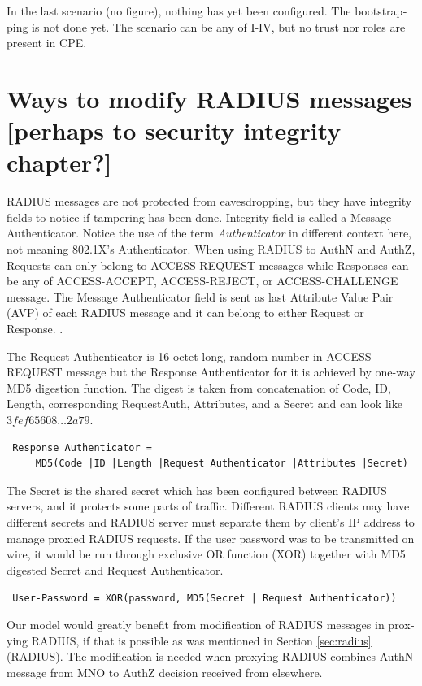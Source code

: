 \documentclass[12pt,a4paper,english]{tutthesis}
\begin{document}
\begin{otherlanguage}{english}
In the last scenario (no figure), nothing has yet been configured. The bootstrapping
is not done yet. The scenario can be any of I-IV, but no trust nor roles are present in CPE.
\section{Ways to modify RADIUS messages [perhaps to security integrity chapter?]}
\label{sec-4-7}
\label{sec:radius-macs}
RADIUS messages are not protected from eavesdropping, but they have
integrity fields to notice if tampering has been done.  
Integrity field is called a Message Authenticator.
Notice the use of the term \emph{Authenticator} in different context here, not
meaning 802.1X's Authenticator.
When using RADIUS to AuthN and AuthZ, Requests can only belong to ACCESS-REQUEST messages while
Responses can be any of ACCESS-ACCEPT, ACCESS-REJECT, or ACCESS-CHALLENGE message.
The Message Authenticator field is sent as last Attribute Value Pair (AVP)
of each RADIUS message and it can belong 
to either Request or Response. \cite[p.20]{radiusbook}.

The Request Authenticator is 16 octet long, random number in
ACCESS-REQUEST message but the Response Authenticator for it is achieved
by one-way MD5 digestion function. 
The digest is taken from concatenation of Code, ID, Length, corresponding
Request\-Auth, Attributes, and a Secret and can look like 
$3fef65608\ldots 2a79$. 
\begin{verbatim}
 Response Authenticator = 
     MD5(Code |ID |Length |Request Authenticator |Attributes |Secret)
\end{verbatim}
The Secret is the shared secret which has been configured between RADIUS servers,
and it protects some parts of traffic. 
Different RADIUS clients may have different
secrets and RADIUS server must separate them by client's IP address to
manage proxied RADIUS requests\cite{radiusbook}.
If the user password was to be transmitted on wire, it would be run
through exclusive OR function (XOR) together with MD5 digested Secret
and Request
Authenticator.
\begin{center}
{\tt 
User-Password = XOR(password, MD5(Secret | Request Authenticator))}
\end{center}



Our model would greatly benefit from modification of RADIUS messages in proxying
RADIUS, if that is possible as was mentioned in Section \ref{sec:radius}(RADIUS).
The modification is needed when proxying RADIUS combines AuthN message
from MNO to AuthZ decision received from elsewhere.







\end{otherlanguage}
\end{document}
